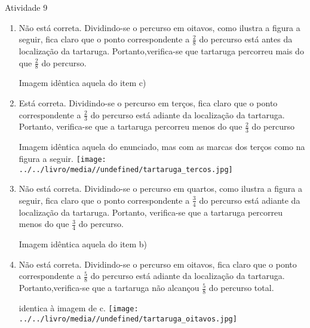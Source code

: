 \documentclass[oneside]{book}
\begin{document}
\begin{multicols}{2}
\begin{resposta*}{Atividade 9}
\begin{enumerate} [\quad a)]
\begin{imagem*}[breakable]{}{}   Imagem idêntica aquela do item b)\end{imagem*}

  \item     Não está correta. Dividindo-se o percurso em oitavos, como ilustra a figura a seguir, fica claro que o ponto correspondente a     $\frac{2}{8}$     do percurso está antes da localização da tartaruga. Portanto,verifica-se que tartaruga percorreu mais do que     $\frac{2}{8}$     do percurso.          

\begin{imagem*}[breakable]{}{}   Imagem idêntica aquela do item c)\end{imagem*}

  \item     Está correta. Dividindo-se o percurso em terços, fica claro que o ponto correspondente a     $\frac{2}{3}$     do percurso está adiante da localização da tartaruga. Portanto, verifica-se que a tartaruga percorreu menos do que     $\frac{2}{3}$     do percurso          

\begin{imagem*}[breakable]{}{}   Imagem idêntica aquela do enunciado, mas com as marcas dos terços como na figura a seguir.           \texttt{[image: ../../livro/media//undefined/tartaruga\_tercos.jpg]}   \end{imagem*}

  \item     Não está correta. Dividindo-se o percurso em quartos, como ilustra a figura a seguir, fica claro que o ponto correspondente a     $\frac{3}{4}$     do percurso está adiante da localização da tartaruga. Portanto, verifica-se que a tartaruga percorreu menos do que     $\frac{3}{4}$     do percurso.          

\begin{imagem*}[breakable]{}{}   Imagem idêntica aquela do item b)\end{imagem*}

\item     Não está correta. Dividindo-se o percurso em oitavos, fica claro que o ponto correspondente a     $\frac{5}{8}$     do percurso está adiante da localização da tartaruga. Portanto,verifica-se que a tartaruga não alcançou     $\frac{5}{8}$     do percurso total.          

\begin{imagem*}[breakable]{}{}   identica à imagem de c.     \texttt{[image: ../../livro/media//undefined/tartaruga\_oitavos.jpg]}\end{imagem*}


\end{enumerate}
\end{resposta*}
\end{multicols}
\end{document}
